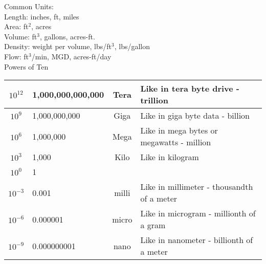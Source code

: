 
Common Units:\\

Length:  inches, ft, miles\\

Area:  ft$^2$, acres \\

Volume:  ft$^3$, gallons, acres-ft.\\

Density:  weight per volume, lbs/ft$^3$, lbs/gallon\\

Flow:  ft$^3$/min, MGD, acres-ft/day\\

		


Powers of Ten

\begin{center}
    
   
    \begin{tabular}{ | c | p{4cm} | c |p{8cm}|}
    \hline


$10^{12}$ & 1,000,000,000,000 & Tera & Like in tera byte drive - trillion\\
\hline 
$10^{9}$ & 1,000,000,000 & Giga & Like in giga byte data - billion\\
\hline
$10^{6}$ & 1,000,000 & Mega & Like in mega bytes or megawatts - million\\
\hline 
$10^{3}$ & 1,000 & Kilo & Like in kilogram \\
\hline 
$10^{0}$ & 1 &  & \\
\hline 
$10^{-3}$ & 0.001 & milli & Like in millimeter - thousandth of a meter\\
\hline 
$10^{-6}$ & 0.000001 & micro & Like in microgram - millionth of a gram \\
\hline 
$10^{-9}$ & 0.000000001 & nano & Like in nanometer - billionth of a meter\\
\hline 


    \end{tabular}
    
    \end{center}


